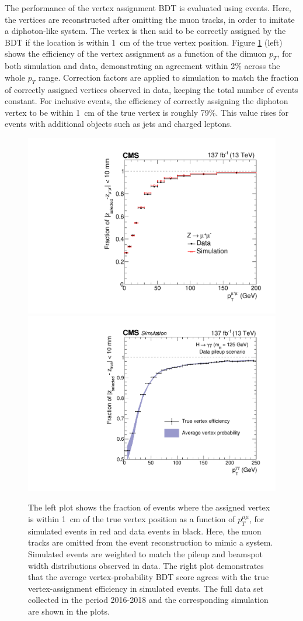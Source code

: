 The performance of the vertex assignment BDT is evaluated using \Zmumu events. Here, the vertices are reconstructed after omitting the muon tracks, in order to imitate a diphoton-like system. The vertex is then said to be correctly assigned by the BDT if the location is within 1~cm of the true vertex position. Figure \ref{fig:vertex_selection_0} (left) shows the efficiency of the vertex assignment as a function of the dimuon $p_T$, for both simulation and data, demonstrating an agreement within 2\% across the whole $p_T$ range. Correction factors are applied to simulation to match the fraction of correctly assigned vertices observed in data, keeping the total number of events constant. For inclusive \Hgg events, the efficiency of correctly assigning the diphoton vertex to be within 1~cm of the true vertex is roughly 79\%. This value rises for events with additional objects such as jets and charged leptons.

\begin{figure}
  \centering
  \includegraphics[width=.49\textwidth]{Figures/hgg_overview/Zmumu_eff_vs_pt_All.pdf}
  \includegraphics[width=.49\textwidth]{Figures/hgg_overview/AverageProbPlotFullRunIIVersusPt.pdf}
  \caption[Vertex-assignment and vertex-probability BDT]
  {
    The left plot shows the fraction of \Zmumu events where the assigned vertex is within 1~cm of the true vertex position as a function of $p_T^{\mu\mu}$, for simulated events in red and data events in black. Here, the muon tracks are omitted from the event reconstruction to mimic a \Hgg system. Simulated events are weighted to match the pileup and beamspot width distributions observed in data. The right plot demonstrates that the average vertex-probability BDT score agrees with the true vertex-assignment efficiency in simulated events. The full data set collected in the period 2016-2018 and the corresponding simulation are shown in the plots.
  }
  \label{fig:vertex_selection_0}
\end{figure}

